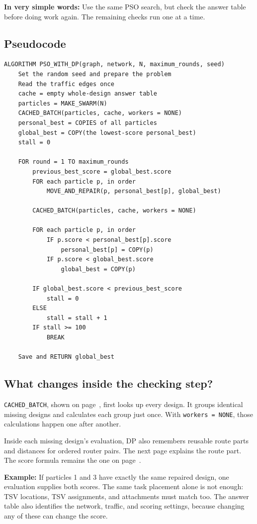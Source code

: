\documentclass[11pt,a4paper]{article}
\newcommand{\code}[1]{\texttt{#1}}
\newcommand{\simple}[1]{\textbf{In very simple words:} #1}
\begin{document}
\simple{Use the same PSO search, but check the answer table before doing work
again. The remaining checks run one at a time.}

\subsection*{Pseudocode}
\begin{lstlisting}
ALGORITHM PSO_WITH_DP(graph, network, N, maximum_rounds, seed)
    Set the random seed and prepare the problem
    Read the traffic edges once
    cache = empty whole-design answer table
    particles = MAKE_SWARM(N)
    CACHED_BATCH(particles, cache, workers = NONE)
    personal_best = COPIES of all particles
    global_best = COPY(the lowest-score personal_best)
    stall = 0

    FOR round = 1 TO maximum_rounds
        previous_best_score = global_best.score
        FOR each particle p, in order
            MOVE_AND_REPAIR(p, personal_best[p], global_best)

        CACHED_BATCH(particles, cache, workers = NONE)

        FOR each particle p, in order
            IF p.score < personal_best[p].score
                personal_best[p] = COPY(p)
            IF p.score < global_best.score
                global_best = COPY(p)

        IF global_best.score < previous_best_score
            stall = 0
        ELSE
            stall = stall + 1
        IF stall >= 100
            BREAK

    Save and RETURN global_best
\end{lstlisting}

\subsection*{What changes inside the checking step?}
\code{CACHED\_BATCH}, shown on page~\pageref{page:batch}, first looks up every
design. It groups identical missing designs and calculates each group just
once. With \code{workers = NONE}, those calculations happen one after another.

Inside each missing design's evaluation, DP also remembers reusable route
parts and distances for ordered router pairs. The next page explains the
route part. The score formula remains the one on page~\pageref{page:shared}.

\textbf{Example:} If particles 1 and 3 have exactly the same repaired design,
one evaluation supplies both scores. The same task placement alone is not
enough: TSV locations, TSV assignments, and attachments must match too.
The answer table also identifies the network, traffic, and scoring settings,
because changing any of these can change the score.
\end{document}
